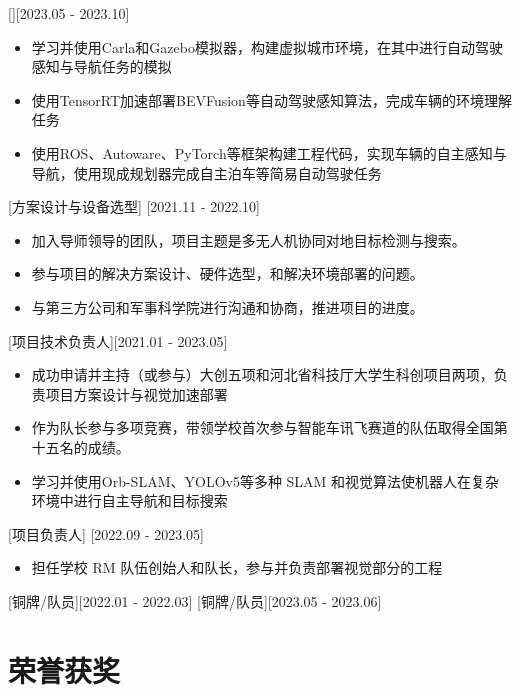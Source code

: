 \documentclass{resume}
\begin{document}
[][2023.05 - 2023.10]
\begin{itemize}
    \item 学习并使用Carla和Gazebo模拟器，构建虚拟城市环境，在其中进行自动驾驶感知与导航任务的模拟
    \item 使用TensorRT加速部署BEVFusion等自动驾驶感知算法，完成车辆的环境理解任务
    \item 使用ROS、Autoware、PyTorch等框架构建工程代码，实现车辆的自主感知与导航，使用现成规划器完成自主泊车等简易自动驾驶任务
\end{itemize}
[方案设计与设备选型]
[2021.11 - 2022.10] 

\begin{itemize}
  \item 加入导师领导的团队，项目主题是多无人机协同对地目标检测与搜索。
  \item 参与项目的解决方案设计、硬件选型，和解决环境部署的问题。
  \item 与第三方公司和军事科学院进行沟通和协商，推进项目的进度。
\end{itemize}


[项目技术负责人][2021.01 - 2023.05] 

\begin{itemize}
  \item 成功申请并主持（或参与）大创五项和河北省科技厅大学生科创项目两项，负责项目方案设计与视觉加速部署
  \item 作为队长参与多项竞赛，带领学校首次参与智能车讯飞赛道的队伍取得全国第十五名的成绩。
  \item 学习并使用Orb-SLAM、YOLOv5等多种 SLAM 和视觉算法使机器人在复杂环境中进行自主导航和目标搜索
\end{itemize}

[项目负责人]
[2022.09 - 2023.05] 

\begin{itemize}
  \item 担任学校 RM 队伍创始人和队长，参与并负责部署视觉部分的工程
\end{itemize}
[铜牌/队员][2022.01 - 2022.03] 
[铜牌/队员][2023.05 - 2023.06] 




\section{荣誉获奖}
\end{document}
